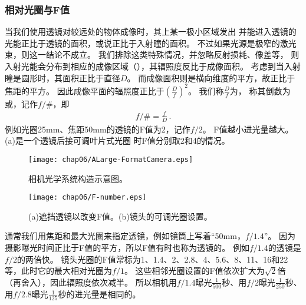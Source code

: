 \subsubsection{相对光圈与F值}
当我们使用透镜对较远处的物体成像时，其上某一极小区域发出
并能进入透镜的光能正比于透镜的面积，或说正比于入射瞳的面积。
不过如果光源是极窄的激光束，则这一结论不成立。
我们排除这类特殊情况，并忽略反射损耗、像差等，
则入射光能会分布到相应的成像区域（），其辐照度反比于成像面积。
考虑到当入射瞳是圆形时，其面积正比于直径$D$。
而成像面积则是横向维度的平方，故正比于焦距的平方。
因此成像平面的辐照度正比于$\displaystyle\left(\frac{D}{f}\right)^2$。
我们称$\displaystyle\frac{D}{f}$为，
称其倒数为或，记作$f/\#$，即
\begin{align}
    f/\#=\frac{f}{D}\, .
\end{align}
例如光圈25mm、焦距50mm的透镜的F值为2，记作$f/2$。
F值越小进光量越大。(a)是一个透镜后接可调叶片式光圈
时F值分别取2和4的情况。
\begin{figure}[htbp]
    \centering\texttt{[image: chap06/ALarge-FormatCamera.eps]}
    \caption{相机光学系统构造示意图。}
    \label{fig:6.52}
\end{figure}
\begin{figure}[htbp]
    \centering\texttt{[image: chap06/F-number.eps]}
    \caption{(a)遮挡透镜以改变F值。(b)镜头的可调光圈设置。}
    \label{fig:6.53}
\end{figure}

通常我们用焦距和最大光圈来指定透镜，例如镜筒上写着“50mm，$f/1.4$”。
因为摄影曝光时间正比于F值的平方，所以F值有时也称为透镜的。
例如$f/1.4$的透镜是$f/2$的两倍快。
镜头光圈的F值常标为1、1.4、2、2.8、4、5.6、8、11、16和22等，此时它的最大相对光圈为$f/1$。
这些相邻光圈设置的F值依次扩大为$\sqrt{2}$倍（再舍入），因此辐照度依次减半。
所以相机用$f/1.4$曝光$\displaystyle\frac{1}{500}$秒、用$f/2$曝光$\displaystyle\frac{1}{250}$秒、
用$f/2.8$曝光$\displaystyle\frac{1}{125}$秒的进光量是相同的。
